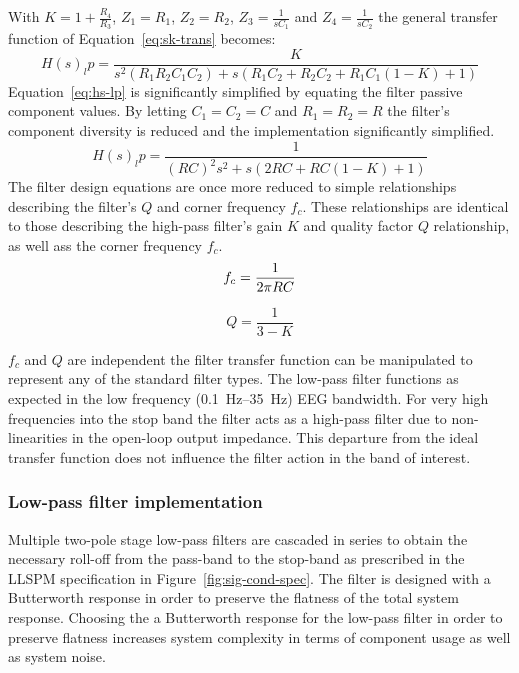 With $K = 1 + \frac{R_4}{R_3}$, $Z_1 = R_1$, $Z_2 = R_2$, $Z_3 =
\frac{1}{sC_1}$ and $Z_4 = \frac{1}{sC_2}$ the general transfer
function of Equation~\ref{eq:sk-trans} becomes:
\begin{equation}
	H(s)_lp = \frac{K}{s^2(R_1R_2C_1C_2) + s(R_1C_2 + R_2C_2 +
	R_1C_1(1 - K) + 1)}
	\label{eq:hs-lp}
\end{equation}
Equation~\ref{eq:hs-lp} is significantly simplified by equating the
filter passive component values. By letting $C_1 = C_2 = C$ and $R_1 =
R_2 = R$ the filter's component diversity is reduced and the
implementation significantly simplified.
\begin{equation}
	H(s)_lp = \frac{1}{(RC)^2s^2 + s(2RC + RC(1 - K) + 1)}
	\label{eq:hs-lp2}
\end{equation}
The filter design equations are once more reduced to simple
relationships describing the filter's $Q$ and corner frequency
$f_c$. These relationships are identical to those describing the
high-pass filter's gain $K$ and quality factor $Q$ relationship, as
well ass the corner frequency $f_c$.
\begin{equation}
	f_c = \frac{1}{2\pi\/RC}
	\label{eq:lp-fc}
\end{equation}

\begin{equation}
	Q = \frac{1}{3 - K}
	\label{eq:lp-q}
\end{equation}

$f_c$ and $Q$ are independent the filter transfer function can be
manipulated to represent any of the standard filter types. The
low-pass filter functions as expected in the low frequency
(0.1~Hz--35~Hz) EEG bandwidth. For very high frequencies into the stop
band the filter acts as a high-pass filter due to non-linearities in
the open-loop output impedance. This departure from the ideal transfer
function does not influence the filter action in the band of interest.

\subsubsection{Low-pass filter implementation}
Multiple two-pole stage low-pass filters are cascaded in series to
obtain the necessary roll-off from the pass-band to the stop-band as
prescribed in the LLSPM specification in
Figure~\vref{fig:sig-cond-spec}. The filter is designed with a
Butterworth response in order to preserve the flatness of the total
system response. Choosing the a Butterworth response for the low-pass
filter in order to preserve flatness increases system complexity in
terms of component usage as well as system noise.

